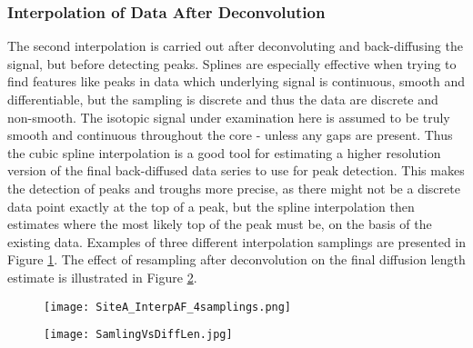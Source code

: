 \documentclass[../../CompleteThesis2/Complete_2ndDraft]{subfiles}
\begin{document}
\subsubsection[Interpolation 2]{Interpolation of Data After Deconvolution}
\label{Subsubsec:CompMethod_StabilityTests_Interpolation2}
The second interpolation is carried out after deconvoluting and back-diffusing the signal, but before detecting peaks. Splines are especially effective when trying to find features like peaks in data which underlying signal is continuous, smooth and differentiable, but the sampling is discrete and thus the data are discrete and non-smooth. The isotopic signal under examination here is assumed to be truly smooth and continuous throughout the core - unless any gaps are present. Thus the cubic spline interpolation is a good tool for estimating a higher resolution version of the final back-diffused data series to use for peak detection. This makes the detection of peaks and troughs more precise, as there might not be a discrete data point exactly at the top of a peak, but the spline interpolation then estimates where the most likely top of the peak must be, on the basis of the existing data. Examples of three different interpolation samplings are presented in Figure \ref{Fig:COMPMETH_SiteA_InterpAF_4samplings}. The effect of resampling after deconvolution on the final diffusion length estimate is illustrated in Figure \ref{Fig:COMPMETH_SamlingVsDiffLen}.

\begin{figure}[h]
	\centering
	\texttt{[image: SiteA\_InterpAF\_4samplings.png]}
	\caption{}
	\label{Fig:COMPMETH_SiteA_InterpAF_4samplings}
\end{figure}

\begin{figure}[h]
	\centering
	\texttt{[image: SamlingVsDiffLen.jpg]}
	\caption{}
	\label{Fig:COMPMETH_SamlingVsDiffLen}
\end{figure}
\end{document}
